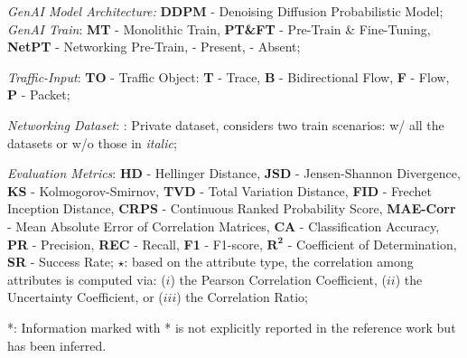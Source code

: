 \begin{table*}[t]
{\begin{threeparttable}
\begin{tabular}{rcccccccccccccc}
\bottomrule
\end{tabular}
\begin{tablenotes}[flushleft]
\Large
\item
\emph{GenAI Model Architecture:} \textbf{DDPM} - Denoising Diffusion Probabilistic Model;
\emph{GenAI Train}: \textbf{MT} - Monolithic Train, \textbf{PT\&FT} - Pre-Train \& Fine-Tuning, \textbf{NetPT} - Networking Pre-Train, \faCheckCircle[regular] - Present, \faTimesCircle[regular] - Absent;
\item
\emph{Traffic-Input}: \textbf{TO} - Traffic Object: \textbf{T} - Trace, \textbf{B} - Bidirectional Flow, \textbf{F} - Flow, \textbf{P} - Packet;
\item
\emph{Networking Dataset}: \dag: Private dataset, \cite{bikmukhamedov2021} considers two train scenarios: w/ all the datasets or w/o those in \emph{italic};
\item 
\emph{Evaluation Metrics}: 
\textbf{HD} - Hellinger Distance, 
\textbf{JSD} - Jensen-Shannon Divergence, 
\textbf{KS} - Kolmogorov-Smirnov, 
\textbf{TVD} - Total Variation Distance, 
\textbf{FID} - Frechet Inception Distance, 
\textbf{CRPS} - Continuous Ranked Probability Score, 
\textbf{MAE-Corr} - Mean Absolute Error of Correlation Matrices, 
\textbf{CA} - Classification Accuracy, 
\textbf{PR} - Precision, 
\textbf{REC} - Recall, 
\textbf{F1} - F1-score, 
\textbf{$\bm{R^2}$} - Coefficient of Determination, 
\textbf{SR} - Success Rate; 
$\star$: based on the attribute type, the correlation among attributes is computed via: ($i$) the Pearson Correlation Coefficient, ($ii$) the Uncertainty Coefficient, or ($iii$) the Correlation Ratio;
\item
*: Information marked with * is not explicitly reported in the reference work but has been inferred.
\end{tablenotes}
\end{threeparttable}
}
\end{table*}